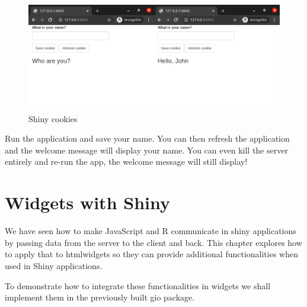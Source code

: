 \documentclass[
]{krantz}
\makeatletter
\newenvironment{Shaded}{\begin{snugshade}}{\end{snugshade}}
\newcommand{\CommentTok}[1]{\textcolor[rgb]{0.37,0.37,0.37}{\textit{#1}}}
\newcommand{\ControlFlowTok}[1]{\textcolor[rgb]{0.27,0.27,0.27}{\textbf{#1}}}
\newcommand{\KeywordTok}[1]{\textcolor[rgb]{0.27,0.27,0.27}{\textbf{#1}}}
\newcommand{\NormalTok}[1]{#1}
\newcommand{\OperatorTok}[1]{\textcolor[rgb]{0.43,0.43,0.43}{\textbf{#1}}}
\newcommand{\StringTok}[1]{\textcolor[rgb]{0.5,0.5,0.5}{#1}}
\newenvironment{kframe}{%
\medskip{}
\setlength{\fboxsep}{.8em}
 \def\at@end@of@kframe{}%
 \ifinner\ifhmode%
  \def\at@end@of@kframe{\end{minipage}}%
  \begin{minipage}{\columnwidth}%
 \fi\fi%
 \def\FrameCommand##1{\hskip\@totalleftmargin \hskip-\fboxsep
 \colorbox{shadecolor}{##1}\hskip-\fboxsep
     \hskip-\linewidth \hskip-\@totalleftmargin \hskip\columnwidth}%
 \MakeFramed {\advance\hsize-\width
   \@totalleftmargin\z@ \linewidth\hsize
   \@setminipage}}%
 {\par\unskip\endMakeFramed%
 \at@end@of@kframe}
\renewenvironment{Shaded}{\begin{kframe}}{\end{kframe}}
\makeatother
\begin{document}
\begin{Shaded}
\end{Shaded}

\begin{figure}
\centering
\includegraphics{images/shiny-cookies-2.png}
\caption{Shiny cookies}
\end{figure}

Run the application and save your name. You can then refresh the application and the welcome message will display your name. You can even kill the server entirely and re-run the app, the welcome message will still display!

\hypertarget{shiny-widgets}{%
\chapter{Widgets with Shiny}\label{shiny-widgets}}

We have seen how to make JavaScript and R communicate in shiny applications by passing data from the server to the client and back. This chapter explores how to apply that to htmlwidgets so they can provide additional functionalities when used in Shiny applications.

To demonstrate how to integrate these functionalities in widgets we shall implement them in the previously built gio package.
\end{document}
